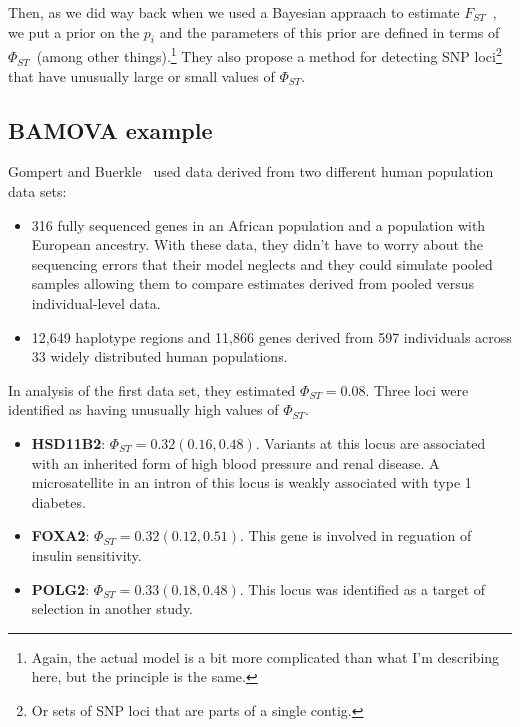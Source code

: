 \documentclass[12pt]{article}
\begin{document}
Then, as we did way back when we used a Bayesian appraach to estimate
$F_{ST}$~\cite{Holsinger-Wallace-2004}, we put a prior on the $p_i$
and the parameters of this prior are defined in terms of
$\Phi_{ST}$~(among other things).\footnote{Again, the actual model is
  a bit more complicated than what I'm describing here, but the
  principle is the same.} They also propose a method for detecting SNP
loci\footnote{Or sets of SNP loci that are parts of a single contig.}
that have unusually large or small values of $\Phi_{ST}$.

\subsection*{BAMOVA example}

Gompert and Buerkle~\cite{Gompert-Buerkle-2011} used data derived from
two different human population data sets:

\begin{itemize}

\item 316 fully sequenced genes in an African population and a
  population with European ancestry. With these data, they didn't have
  to worry about the sequencing errors that their model neglects and
  they could simulate pooled samples allowing them to compare
  estimates derived from pooled versus individual-level data.

\item 12,649 haplotype regions and 11,866 genes derived from 597
  individuals across 33 widely distributed human populations.

\end{itemize}

In analysis of the first data set, they estimated
$\Phi_{ST}=0.08$. Three loci were identified as having unusually high
values of $\Phi_{ST}$. 

\begin{itemize}

\item {\bf HSD11B2}: $\Phi_{ST}=0.32 (0.16,0.48)$. Variants at this
  locus are associated with an inherited form of high blood pressure
  and renal disease. A microsatellite in an intron of this locus is
  weakly associated with type 1 diabetes.

\item {\bf FOXA2}: $\Phi_{ST}=0.32 (0.12,0.51)$. This gene is involved
  in reguation of insulin sensitivity.

\item {\bf POLG2}: $\Phi_{ST}=0.33 (0.18,0.48)$. This locus was
  identified as a target of selection in another study.

\end{itemize}
\end{document}
